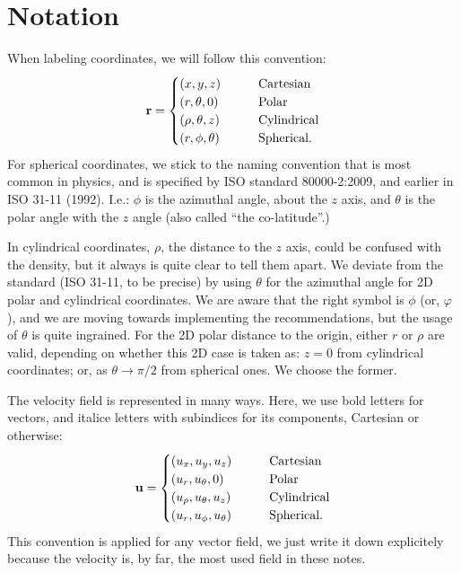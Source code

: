 \section{Notation}
\label{sec:notation}

When labeling coordinates, we will follow this convention:
\begin{equation*}
  \mathbf{r} =
  \begin{cases}
   ( x, y, z)  &\qquad \text{Cartesian} \\
   ( r, \theta, 0 ) & \qquad \text{Polar} \\
   ( \rho, \theta, z) &\qquad \text{Cylindrical} \\
    ( r , \phi , \theta) &\qquad \text{Spherical} .
  \end{cases}
\end{equation*}
For spherical coordinates, we stick to the naming convention that is
most common in physics, and is specified by ISO standard 80000-2:2009,
and earlier in ISO 31-11 (1992). I.e.: $\phi$ is the azimuthal angle,
about the $z$ axis, and $\theta$ is the polar angle with the $z$ angle
(also called ``the co-latitude''.)

In cylindrical coordinates, $\rho$, the distance to the $z$ axis,
could be confused with the density, but it always is quite clear to
tell them apart. We deviate from the standard (ISO 31-11, to be
precise) by using $\theta$ for the azimuthal angle for 2D polar and
cylindrical coordinates. We are aware that the right symbol is $\phi$
(or, $\varphi$), and we are moving towards implementing the
recommendations, but the usage of $\theta$ is quite ingrained. For the
2D polar distance to the origin, either $r$ or $\rho$ are valid,
depending on whether this 2D case is taken as: $z = 0$ from
cylindrical coordinates; or, as $\theta \to \pi/2$ from spherical
ones. We choose the former.

The velocity field is represented in many ways. Here, we use bold
letters for vectors, and italice letters with subindices for its
components, Cartesian or otherwise:
\begin{align*}
  \mathbf{u} =
  \begin{cases}
     ( u_x, u_y, u_z)& \qquad \text{Cartesian} \\
     ( u_r, u_\theta, 0 )& \qquad \text{Polar} \\
     ( u_\rho, u_\theta, u_z)& \qquad \text{Cylindrical} \\
     ( u_r , u_\phi , u_\theta)& \qquad \text{Spherical} .
   \end{cases}
\end{align*}
This convention is applied for any vector field, we just write it down
explicitely because the velocity is, by far, the most used field in
these notes.

